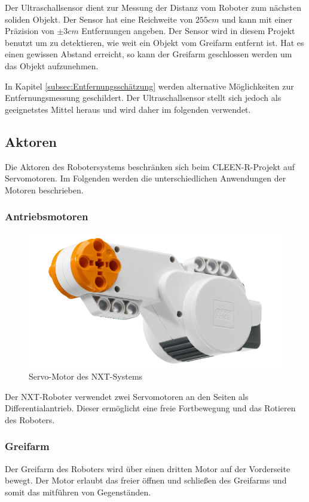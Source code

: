 Der Ultraschallsensor dient zur Messung der Distanz vom Roboter zum nächsten soliden Objekt. Der Sensor hat eine Reichweite von $255cm$ und kann mit einer Präzision von $\pm 3cm$ Entfernungen angeben. Der Sensor wird in diesem Projekt benutzt um zu detektieren, wie weit ein Objekt vom Greifarm entfernt ist. Hat es einen gewissen Abstand erreicht, so kann der Greifarm geschlossen werden um das Objekt aufzunehmen. 

In Kapitel \ref{subsec:Entfernungsschätzung} werden alternative Möglichkeiten zur Entfernungsmessung geschildert. Der Ultraschallsensor stellt sich jedoch als geeignetstes Mittel heraus und wird daher im folgenden verwendet.

\subsection{Aktoren}

Die Aktoren des Robotersystems beschränken sich beim CLEEN-R-Projekt auf Servomotoren. Im Folgenden werden die unterschiedlichen Anwendungen der Motoren beschrieben.

\subsubsection{Antriebsmotoren}

\begin{figure}[h]
\centering
\includegraphics[width=\textwidth/3]{Bilder/Robot/motor}
\caption{Servo-Motor des NXT-Systems}
\label{fig:motor}
\end{figure}

Der NXT-Roboter verwendet zwei Servomotoren an den Seiten als Differentialantrieb. Dieser ermöglicht eine freie Fortbewegung und das Rotieren des Roboters. 

\subsubsection{Greifarm}
\label{greifarm}
Der Greifarm des Roboters wird über einen dritten Motor auf der Vorderseite bewegt. Der Motor erlaubt das freier öffnen und schließen des Greifarms und somit das mitführen von Gegenständen. 

